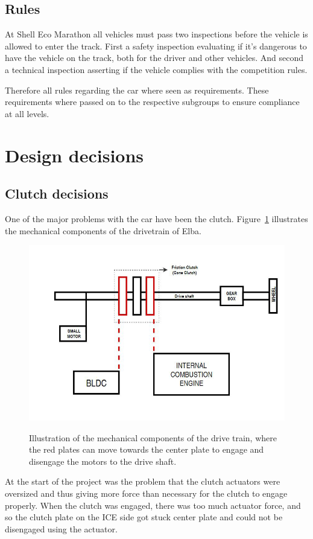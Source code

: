 \subsection{Rules}
At Shell Eco Marathon all vehicles must pass two inspections before the vehicle
is allowed to enter the track. First a safety inspection evaluating if it's
dangerous to have the vehicle on the track, both for the driver and other
vehicles. And second a technical inspection asserting if the vehicle complies
with the competition rules.

Therefore all rules regarding the car where seen as requirements. These requirements where passed on to the respective subgroups to ensure compliance at all levels. 

\section{Design decisions}
\subsection{Clutch decisions}

One of the major problems with the car have been the clutch.
Figure~\ref{fig:Drivetrain} illustrates the mechanical components of the
drivetrain of Elba.

\begin{figure}[H]
    \centering\label{fig:Drivetrain}
    \includegraphics[width=1\textwidth]{./img/Drivetrain}
    \caption{Illustration of the mechanical components of the drive train, where the red plates can move towards the center plate to engage and disengage the motors to the drive shaft.}
\end{figure}
At the start of the project was the problem that the clutch actuators were
oversized and thus giving more force than necessary for the clutch to engage
properly. When the clutch was engaged, there was too much actuator force, and so
the clutch plate on the ICE side got stuck center plate and could not be
disengaged using the actuator.

